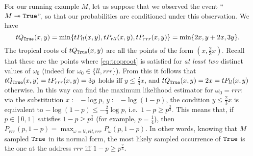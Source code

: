 \begin{example}
For our running example $M$, 
let us suppose that we observed the event ``$M\twoheadrightarrow\mathtt{True}$'', so that our probabilities are conditioned under this observation. We have
\[\trop Q_{\true}(x,y)=\min\set{\trop P_{ll}(x,y),\trop  P_{rll}(x,y),\trop P_{rrr}(x,y)}=\min
\set{2x,y+2x,3y}.\]
The tropical roots of $\trop Q_{\true}(x,y)$ are all the points of the form $(x,\frac{2}{3}x)$. Recall that these are the points where \eqref{eq:troproot} is satisfied for \emph{at least two} distinct values of $\omega_{0}$ (indeed for $\omega_{0}\in \{ll, rrr\}$). From this it follows that $\trop Q_{\true} (x,y)=\trop P_{rrr}(x,y)=3y$ holds iff $y\leq \frac{2}{3}x$, and  $\trop Q_{\true}(x,y)=2x=\trop P_{ll}(x,y)$ otherwise.
In this way can find the maximum likelihood estimator for $\omega_0=rrr$:
via the substitution $x:=-\log p$, $y:=-\log (1-p)$, the condition $y\leq \frac{2}{3}x$ is equivalent to $-\log (1-p)\leq -\frac{2}{3}\log p$, i.e.\ $1-p\geq p^{\frac{2}{3}}$.
This means that, if $p\in[0,1]$ satisfies $1-p\geq p^{\frac{2}{3}}$ (for example, $p=\frac{1}{4}$), then $P_{rrr}(p,1-p) = \max_{\omega=ll, rll, rrr} P_{\omega}(p,1-p)$. In other words, knowing that $M$ sampled $\mathtt{True}$ in its normal form, the most likely sampled occurrence of $\mathtt{True}$ is the one at the address $rrr$ iff $1-p\geq p^{\frac{2}{3}}$.
\end{example}

